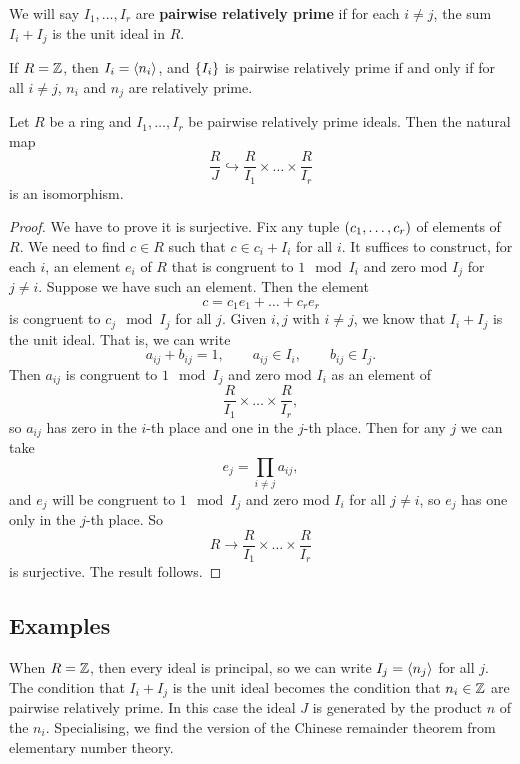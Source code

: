 \begin{definition}
We will say $ I_1, \dots, I_r $ are \textbf{pairwise relatively prime} if for each $ i \ne j $, the sum $ I_i + I_j $ is the unit ideal in $ R $.
\end{definition}

If $ R = \mathbb{Z} $, then $ I_i = \left\langle n_i \right\rangle $, and $ \left\{ I_i \right\} $ is pairwise relatively prime if and only if for all $ i \ne j $, $ n_i $ and $ n_j $ are relatively prime.

\begin{theorem}
Let $ R $ be a ring and $ I_1, \dots, I_r $ be pairwise relatively prime ideals. Then the natural map
$$ \dfrac{R}{J} \hookrightarrow \dfrac{R}{I_1} \times \dots \times \dfrac{R}{I_r} $$
is an isomorphism.
\end{theorem}

\begin{proof}
We have to prove it is surjective. Fix any tuple $ \left( c_1, \dots, c_r \right) $ of elements of $ R $. We need to find $ c \in R $ such that $ c \in c_i + I_i $ for all $ i $. It suffices to construct, for each $ i $, an element $ e_i $ of $ R $ that is congruent to $ 1 \mod I_i $ and zero mod $ I_j $ for $ j \ne i $. Suppose we have such an element. Then the element
$$ c = c_1e_1 + \dots + c_re_r $$
is congruent to $ c_j \mod I_j $ for all $ j $. Given $ i, j $ with $ i \ne j $, we know that $ I_i + I_j $ is the unit ideal. That is, we can write
$$ a_{ij} + b_{ij} = 1, \qquad a_{ij} \in I_i, \qquad b_{ij} \in I_j. $$
Then $ a_{ij} $ is congruent to $ 1 \mod I_j $ and zero mod $ I_i $ as an element of
$$ \dfrac{R}{I_1} \times \dots \times \dfrac{R}{I_r}, $$
so $ a_{ij} $ has zero in the $ i $-th place and one in the $ j $-th place. Then for any $ j $ we can take
$$ e_j = \prod_{i \ne j} a_{ij}, $$
and $ e_j $ will be congruent to $ 1 \mod I_j $ and zero mod $ I_i $ for all $ j \ne i $, so $ e_j $ has one only in the $ j $-th place. So
$$ R \to \dfrac{R}{I_1} \times \dots \times \dfrac{R}{I_r} $$
is surjective. The result follows.
\end{proof}

\subsection{Examples}

When $ R = \mathbb{Z} $, then every ideal is principal, so we can write $ I_j = \left\langle n_j \right\rangle $ for all $ j $. The condition that $ I_i + I_j $ is the unit ideal becomes the condition that $ n_i \in \mathbb{Z} $ are pairwise relatively prime. In this case the ideal $ J $ is generated by the product $ n $ of the $ n_i $. Specialising, we find the version of the Chinese remainder theorem from elementary number theory.

